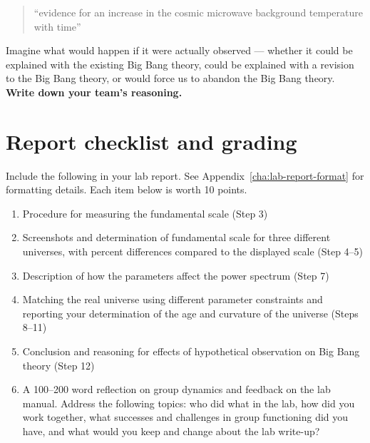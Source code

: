 \begin{quote}
	``evidence for an increase in the cosmic microwave background temperature with time''
\end{quote}

\begin{steps}
	\item Imagine what would happen if it were actually observed --- whether it could be explained with the existing Big Bang theory, could be explained with a revision to the Big Bang theory, or would force us to abandon the Big Bang theory. \textbf{Write down your team's reasoning.}

\end{steps}

\section{Report checklist and grading}

Include the following in your lab report. See Appendix~\ref{cha:lab-report-format} for formatting details. Each item below is worth 10 points.

\begin{enumerate}
%	
	
	\item Procedure for measuring the fundamental scale (Step 3)
	
	\item Screenshots and determination of fundamental scale for three different universes, with percent differences compared to the displayed scale (Step 4--5)
	
	\item Description of how the parameters affect the power spectrum (Step 7)
	
	\item Matching the real universe using different parameter constraints and reporting your determination of the age and curvature of the universe (Steps 8--11)

	\item Conclusion and reasoning for effects of hypothetical observation on Big Bang theory (Step 12)
	
	\item A 100--200 word reflection on group dynamics and feedback on the lab manual. Address the following topics: who did what in the lab, how did you work together, what successes and challenges in group functioning did you have, and what would you keep and change about the lab write-up?
\end{enumerate}